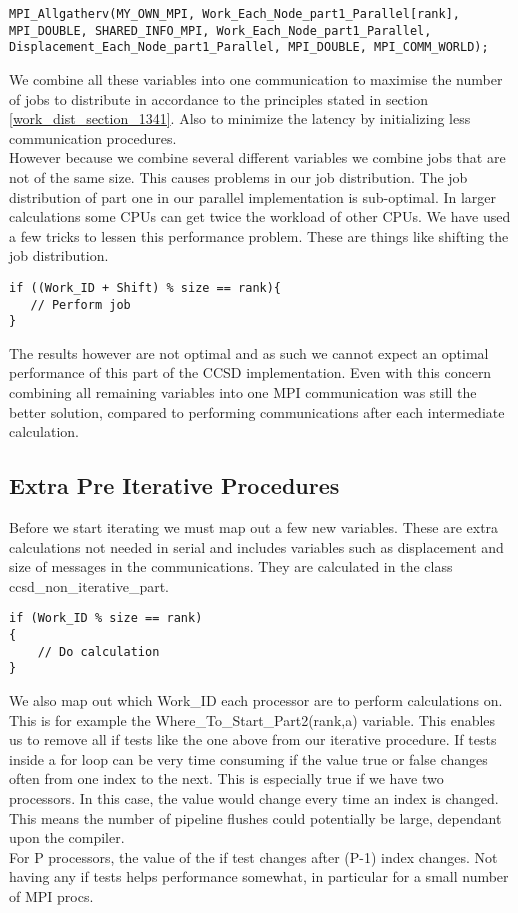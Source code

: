 \begin{lstlisting}
MPI_Allgatherv(MY_OWN_MPI, Work_Each_Node_part1_Parallel[rank], MPI_DOUBLE, SHARED_INFO_MPI, Work_Each_Node_part1_Parallel, Displacement_Each_Node_part1_Parallel, MPI_DOUBLE, MPI_COMM_WORLD);
\end{lstlisting}

We combine all these variables into one communication to maximise the number of jobs to distribute in accordance to the principles stated in section \ref{work_dist_section_1341}. Also to minimize the latency by initializing less communication procedures. \\

However because we combine several different variables we combine jobs that are not of the same size. This causes problems in our job distribution. The job distribution of part one in our parallel implementation is sub-optimal. In larger calculations some CPUs can get twice the workload of other CPUs. We have used a few tricks to lessen this performance problem. These are things like shifting the job distribution.

\begin{lstlisting}
if ((Work_ID + Shift) % size == rank){
   // Perform job
}
\end{lstlisting}

The results however are not optimal and as such we cannot expect an optimal performance of this part of the CCSD implementation. Even with this concern combining all remaining variables into one MPI communication was still the better solution, compared to performing communications after each intermediate calculation.   

\newpage

\subsection{Extra Pre Iterative Procedures}
Before we start iterating we must map out a few new variables. These are extra calculations not needed in serial and includes variables such as displacement and size of messages in the communications. They are calculated in the class \\ ccsd\_non\_iterative\_part. \\

\begin{lstlisting}
if (Work_ID % size == rank)
{
    // Do calculation
}
\end{lstlisting}

We also map out which Work\_ID each processor are to perform calculations on. This is for example the Where\_To\_Start\_Part2(rank,a) variable. This enables us to remove all if tests like the one above from our iterative procedure. If tests inside a for loop can be very time consuming if the value true or false changes often from one index to the next. This is especially true if we have two processors. In this case, the value would change every time an index is changed. This means the number of pipeline flushes could potentially be large, dependant upon the compiler. \\

For P processors, the value of the if test changes after (P-1) index changes. Not having any if tests helps performance somewhat, in particular for a small number of MPI procs.

